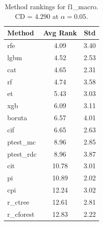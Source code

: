 \begin{table}[h]
\centering
\caption{Method rankings for f1_macro. CD = 4.290 at $\alpha=0.05$.}
\label{tab:ranks_f1_macro}
\begin{tabular}{lcc}
\toprule
Method & Avg Rank & Std \\
\midrule
rfe & 4.09 & 3.40 \\
lgbm & 4.52 & 2.53 \\
cat & 4.65 & 2.31 \\
rf & 4.74 & 3.58 \\
et & 5.43 & 3.03 \\
xgb & 6.09 & 3.11 \\
boruta & 6.57 & 4.01 \\
cif & 6.65 & 2.63 \\
ptest_mc & 8.96 & 2.85 \\
ptest_rdc & 8.96 & 3.87 \\
cit & 10.78 & 3.01 \\
pi & 10.89 & 2.02 \\
cpi & 12.24 & 3.02 \\
r_ctree & 12.61 & 2.81 \\
r_cforest & 12.83 & 2.22 \\
\bottomrule
\end{tabular}
\end{table}